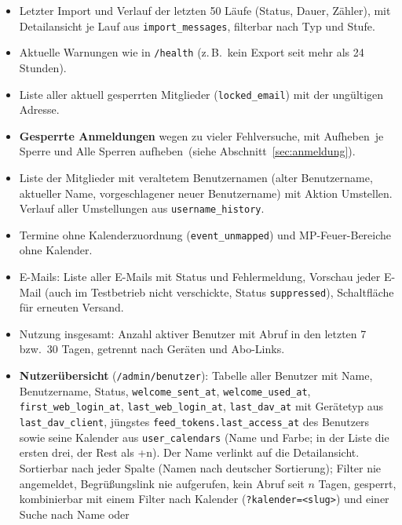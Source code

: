 \documentclass[a4paper,fontsize=10pt]{scrartcl}
\newcommand{\code}[1]{\texttt{#1}}
\begin{document}
\begin{itemize}
  \item Letzter Import und Verlauf der letzten 50 Läufe (Status, Dauer,
        Zähler), mit Detailansicht je Lauf aus \code{import\_messages},
        filterbar nach Typ und Stufe.
  \item Aktuelle Warnungen wie in \code{/health} (z.\,B.\ kein Export seit
        mehr als 24 Stunden).
  \item Liste aller aktuell gesperrten Mitglieder (\code{locked\_email}) mit
        der ungültigen Adresse.
  \item \textbf{Gesperrte Anmeldungen} wegen zu vieler Fehlversuche, mit
        \glqq Aufheben\grqq\ je Sperre und \glqq Alle Sperren aufheben\grqq\
        (siehe Abschnitt~\ref{sec:anmeldung}).
  \item Liste der Mitglieder mit veraltetem Benutzernamen (alter
        Benutzername, aktueller Name, vorgeschlagener neuer Benutzername)
        mit Aktion \glqq Umstellen\grqq. Verlauf aller Umstellungen aus
        \code{username\_history}.
  \item Termine ohne Kalenderzuordnung (\code{event\_unmapped}) und
        MP-Feuer-Bereiche ohne Kalender.
  \item E-Mails: Liste aller E-Mails mit Status und Fehlermeldung,
        Vorschau jeder E-Mail (auch im Testbetrieb nicht verschickte,
        Status \code{suppressed}), Schaltfläche für erneuten Versand.
  \item Nutzung insgesamt: Anzahl aktiver Benutzer mit Abruf in den letzten
        7 bzw.\ 30 Tagen, getrennt nach Geräten und Abo-Links.
  \item \textbf{Nutzerübersicht} (\code{/admin/benutzer}): Tabelle aller
        Benutzer mit Name, Benutzername, Status, \code{welcome\_sent\_at},
        \code{welcome\_used\_at}, \code{first\_web\_login\_at},
        \code{last\_web\_login\_at}, \code{last\_dav\_at} mit Gerätetyp
        aus \code{last\_dav\_client}, jüngstes
        \code{feed\_tokens.last\_access\_at} des Benutzers sowie seine
        Kalender aus \code{user\_calendars} (Name und Farbe; in der
        Liste die ersten drei, der Rest als \glqq +n\grqq). Der Name
        verlinkt auf die Detailansicht. Sortierbar nach jeder Spalte
        (Namen nach deutscher Sortierung); Filter
        \glqq nie angemeldet\grqq, \glqq Begrüßungslink nie
        aufgerufen\grqq, \glqq kein Abruf seit $n$ Tagen\grqq,
        \glqq gesperrt\grqq, kombinierbar mit einem Filter nach Kalender
        (\code{?kalender=<slug>}) und einer Suche nach Name oder

\end{itemize}
\end{document}
